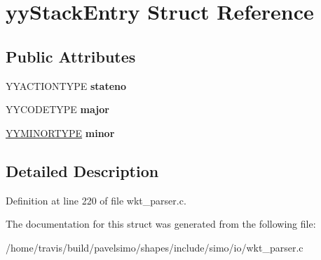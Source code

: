 \hypertarget{structyy_stack_entry}{\section{yy\-Stack\-Entry Struct Reference}
\label{structyy_stack_entry}
}
\subsection*{Public Attributes}
\begin{DoxyCompactItemize}
\item 
\hypertarget{structyy_stack_entry_a108164609c2e841577cc3533d8f0180d}{Y\-Y\-A\-C\-T\-I\-O\-N\-T\-Y\-P\-E {\bfseries stateno}}\label{structyy_stack_entry_a108164609c2e841577cc3533d8f0180d}

\item 
\hypertarget{structyy_stack_entry_a7624d02bcf945d48068f4c383551725c}{Y\-Y\-C\-O\-D\-E\-T\-Y\-P\-E {\bfseries major}}\label{structyy_stack_entry_a7624d02bcf945d48068f4c383551725c}

\item 
\hypertarget{structyy_stack_entry_a024e1e64bce5945080629a2dd8d1bb4f}{\hyperlink{union_y_y_m_i_n_o_r_t_y_p_e}{Y\-Y\-M\-I\-N\-O\-R\-T\-Y\-P\-E} {\bfseries minor}}\label{structyy_stack_entry_a024e1e64bce5945080629a2dd8d1bb4f}

\end{DoxyCompactItemize}


\subsection{Detailed Description}


Definition at line 220 of file wkt\-\_\-parser.\-c.



The documentation for this struct was generated from the following file\-:\begin{DoxyCompactItemize}
\item 
/home/travis/build/pavelsimo/shapes/include/simo/io/wkt\-\_\-parser.\-c\end{DoxyCompactItemize}
